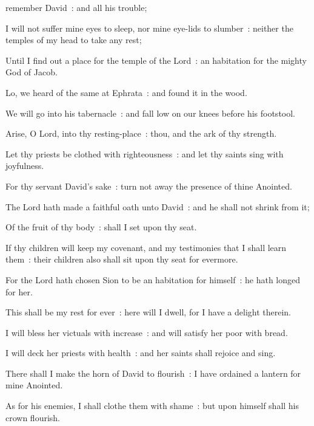  remember David~: and all his trouble;\par
{}
I will not suffer mine eyes to sleep, nor mine eye-lids to slumber~: neither the temples of my head to take any rest;\par
{}Until I find out a place for the temple of the Lord~: an habitation for the mighty God of Jacob.\par
{}Lo, we heard of the same at Ephrata~: and found it in the wood.\par
{}We will go into his tabernacle~: and fall low on our knees before his footstool.\par
{}Arise, O Lord, into thy resting-place~: thou, and the ark of thy strength.\par
{}Let thy priests be clothed with righteousness~: and let thy saints sing with joyfulness.\par
{}For thy servant David's sake~: turn not away the presence of thine Anointed.\par
{}The Lord hath made a faithful oath unto David~: and he shall not shrink from it;\par
{}Of the fruit of thy body~: shall I set upon thy seat.\par
{}If thy children will keep my covenant, and my testimonies that I shall learn them~: their children also shall sit upon thy seat for evermore.\par
{}For the Lord hath chosen Sion to be an habitation for himself~: he hath longed for her.\par
{}This shall be my rest for ever~: here will I dwell, for I have a delight therein.\par
{}I will bless her victuals with increase~: and will satisfy her poor with bread.\par
{}I will deck her priests with health~: and her saints shall rejoice and sing.\par
{}There shall I make the horn of David to flourish~: I have ordained a lantern for mine Anointed.\par
{}As for his enemies, I shall clothe them with shame~: but upon himself shall his crown flourish.\par

